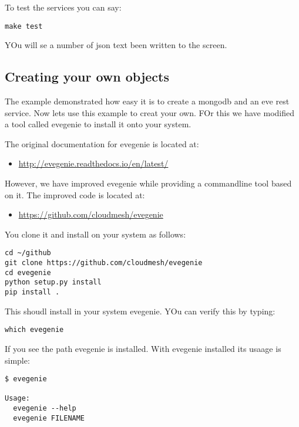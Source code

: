 To test the services you can say:

\begin{verbatim}
make test
\end{verbatim}

YOu will se a number of json text been written to the screen.

\subsection{Creating your own objects}\label{creating-your-own-objects}

The example demonstrated how easy it is to create a mongodb and an eve
rest service. Now lets use this example to creat your own. FOr this we
have modified a tool called evegenie to install it onto your system.

The original documentation for evegenie is located at:

\begin{itemize}
\tightlist
\item
 \url{http://evegenie.readthedocs.io/en/latest/}
\end{itemize}

However, we have improved evegenie while providing a commandline tool
based on it. The improved code is located at:

\begin{itemize}
\tightlist
\item
 \url{https://github.com/cloudmesh/evegenie}
\end{itemize}

You clone it and install on your system as follows:

\begin{verbatim}
cd ~/github
git clone https://github.com/cloudmesh/evegenie
cd evegenie
python setup.py install
pip install .
\end{verbatim}

This shoudl install in your system evegenie. YOu can verify this by
typing:

\begin{verbatim}
which evegenie
\end{verbatim}

If you see the path evegenie is installed. With evegenie installed its
usaage is simple:

\begin{verbatim}
$ evegenie

Usage:
  evegenie --help
  evegenie FILENAME
\end{verbatim}

